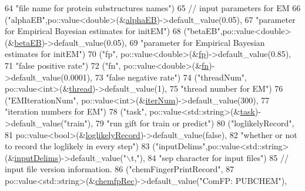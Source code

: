 \begin{DoxyCode}
64        \textcolor{stringliteral}{"file name for protein substructures names"})
65       \textcolor{comment}{// input parameters for EM}
66       (\textcolor{stringliteral}{"alphaEB"},po::value<double>(&\hyperlink{classgift_1_1parameters_adbe3588acaf5006d064586809ffa3d28}{alphaEB})->default\_value(0.05),
67        \textcolor{stringliteral}{"parameter for Empirical Bayesian estimates for initEM"})
68       (\textcolor{stringliteral}{"betaEB"},po::value<double>(&\hyperlink{classgift_1_1parameters_a5c4260c7b30043ee69799d31d3a2a78e}{betaEB})->default\_value(0.05),
69        \textcolor{stringliteral}{"parameter for Empirical Bayesian estimates for initEM"})
70       (\textcolor{stringliteral}{"fp"}, po::value<double>(&\hyperlink{classgift_1_1parameters_ada8450efdd6cac84464deee710c130c3}{fp})->default\_value(0.85),
71        \textcolor{stringliteral}{"false positive rate"})
72       (\textcolor{stringliteral}{"fn"}, po::value<double>(&\hyperlink{classgift_1_1parameters_a013c5a70224e76299291635dd1378c95}{fn})->default\_value(0.0001),
73        \textcolor{stringliteral}{"false negative rate"})
74       (\textcolor{stringliteral}{"threadNum"}, po::value<int>(&\hyperlink{classgift_1_1parameters_a0af23934a569abd605e9521df0a049ce}{thread})->default\_value(1),
75        \textcolor{stringliteral}{"thread number for EM"})
76       (\textcolor{stringliteral}{"EMIterationNum"}, po::value<int>(&\hyperlink{classgift_1_1parameters_af6c28fdac7f38e09583f4545a0bf022d}{iterNum})->default\_value(300),
77        \textcolor{stringliteral}{"iteration numbers for EM"})
78       (\textcolor{stringliteral}{"task"}, po::value<std::string>(&\hyperlink{classgift_1_1parameters_a59c1e1b83354be0dcc511743c4fe0cc1}{task})->default\_value(\textcolor{stringliteral}{"train"}),
79        \textcolor{stringliteral}{"run gift for train or predict"})
80       (\textcolor{stringliteral}{"loglikelyRecord"},
81        po::value<bool>(&\hyperlink{classgift_1_1parameters_a685b9b92d640eb6806a481623b2baf40}{loglikelyRecord})->default\_value(\textcolor{keyword}{false}),
82        \textcolor{stringliteral}{"whether or not to record the loglikely in every step"})
83       (\textcolor{stringliteral}{"inputDelims"},po::value<std::string>(&\hyperlink{classgift_1_1parameters_a35680722bd40ee2cb5434ca7736e9bac}{inputDelims})->default\_value(\textcolor{stringliteral}{"\(\backslash\)t,"}),
84        \textcolor{stringliteral}{"sep character for input files"})
85       \textcolor{comment}{// input file version information.}
86       (\textcolor{stringliteral}{"chemFingerPrintRecord"},
87        po::value<std::string>(&\hyperlink{classgift_1_1parameters_a87d9659a5c46d7075e8a795b51b7ce82}{chemfpRec})->default\_value(\textcolor{stringliteral}{"ComFP: PUBCHEM"}),

\end{DoxyCode}
